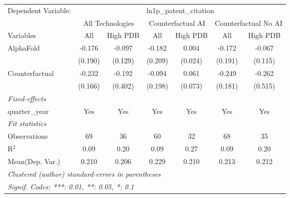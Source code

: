 \begingroup
\centering
\begin{tabular}{lcccccc}
   \tabularnewline \midrule \midrule
   Dependent Variable: & \multicolumn{6}{c}{ln1p\_patent\_citation}\\
 & \multicolumn{2}{c}{All Technologies} & \multicolumn{2}{c}{Counterfactual AI} & \multicolumn{2}{c}{Counterfactual No AI} \\
\cmidrule(lr){1-1}\cmidrule(lr){2-3} \cmidrule(lr){4-5} \cmidrule(lr){6-7}
Variables & \multicolumn{1}{c}{All} & \multicolumn{1}{c}{High PDB} & \multicolumn{1}{c}{All} & \multicolumn{1}{c}{High PDB} & \multicolumn{1}{c}{All} & \multicolumn{1}{c}{High PDB} \\
\cmidrule(lr){1-1}\cmidrule(lr){2-2} \cmidrule(lr){3-3} \cmidrule(lr){4-4} \cmidrule(lr){5-5} \cmidrule(lr){6-6} \cmidrule(lr){7-7}
   AlphaFold      & -0.176  & -0.097  & -0.182  & 0.004   & -0.172  & -0.067\\   
                  & (0.190) & (0.129) & (0.209) & (0.024) & (0.191) & (0.115)\\   
   Counterfactual & -0.232  & -0.192  & -0.094  & 0.061   & -0.249  & -0.262\\   
                  & (0.166) & (0.402) & (0.198) & (0.073) & (0.181) & (0.515)\\   
   \midrule
   \emph{Fixed-effects}\\
   quarter\_year  & Yes     & Yes     & Yes     & Yes     & Yes     & Yes\\  
   \midrule
   \emph{Fit statistics}\\
   Observations   & 69      & 36      & 60      & 32      & 68      & 35\\  
   R$^2$          & 0.09    & 0.20    & 0.09    & 0.27    & 0.09    & 0.20\\  
Mean(Dep. Var.) & 0.210 & 0.206 & 0.229 & 0.210 & 0.213 & 0.212 \\
   \midrule \midrule
   \multicolumn{7}{l}{\emph{Clustered (author) standard-errors in parentheses}}\\
   \multicolumn{7}{l}{\emph{Signif. Codes: ***: 0.01, **: 0.05, *: 0.1}}\\
\end{tabular}
\par\endgroup
